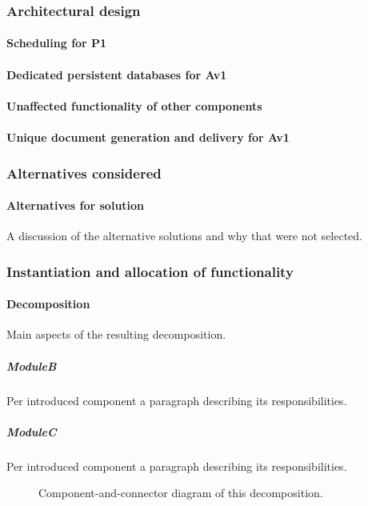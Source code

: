 \documentclass[a4paper,10pt]{article}
\begin{document}
\subsubsection{Architectural design}
\paragraph{Scheduling for P1}


\paragraph{Dedicated persistent databases for Av1}


\paragraph{Unaffected functionality of other components}


\paragraph{Unique document generation and delivery for Av1}


\subsubsection*{Alternatives considered}
\paragraph{Alternatives for solution}
A discussion of the alternative solutions and why that were not selected.

\subsubsection{Instantiation and allocation of functionality}
\paragraph{Decomposition}
Main aspects of the resulting decomposition.

\subparagraph{ModuleB}
Per introduced component a paragraph describing its responsibilities.

\subparagraph{ModuleC}
Per introduced component a paragraph describing its responsibilities.

\begin{figure}[!htp]
	\centering
	\caption{Component-and-connector diagram of this decomposition.
	}\label{fig:it1-cc_main}
\end{figure}
\end{document}
